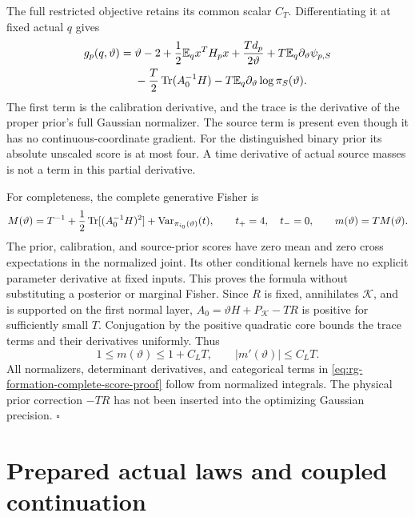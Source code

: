 The full restricted objective retains its common scalar $C_T$.
Differentiating it at fixed actual $q$ gives
\begin{align}
 g_p(q,\vartheta)
 ={}&\vartheta-2+\frac12\mathbb E_qx^TH_px
       +\frac{Td_p}{2\vartheta}
       +T\mathbb E_q\partial_\vartheta\psi_{p,S}
 \notag\\
 &-\frac T2\operatorname{Tr}(A_0^{-1}H)
       -T\mathbb E_q\partial_\vartheta\log\pi_S(\vartheta).
 \label{eq:rg-formation-complete-score-proof}
\end{align}
The first term is the calibration derivative, and the trace is the
derivative of the proper prior's full Gaussian normalizer. The source
term is present even though it has no continuous-coordinate gradient.
For the distinguished binary prior its absolute unscaled score is at
most four. A time derivative of actual source masses is not a term in
this partial derivative.

For completeness, the complete generative Fisher is
\begin{equation}
 M(\vartheta)=T^{-1}
   +\frac12\operatorname{Tr}[(A_0^{-1}H)^2]
   +\operatorname{Var}_{\pi_{i_0}(\vartheta)}(t),
 \qquad t_+=4,\quad t_-=0,
 \qquad m(\vartheta)=TM(\vartheta).
 \label{eq:rg-formation-inherited-metric-proof}
\end{equation}
The prior, calibration, and source-prior scores have zero mean and
zero cross expectations in the normalized joint. Its other conditional
kernels have no explicit parameter derivative at fixed inputs. This
proves the formula without substituting a posterior or marginal
Fisher. Since $R$ is fixed, annihilates $\mathcal K$, and is supported
on the first normal layer, $A_0=\vartheta H+P_{\mathcal K}-TR$ is
positive for sufficiently small $T$. Conjugation by the positive
quadratic core bounds the trace terms and their derivatives uniformly.
Thus
\begin{equation}
 1\le m(\vartheta)\le1+C_LT,\qquad
 |m'(\vartheta)|\le C_LT.
 \label{eq:rg-formation-metric-bounds-proof}
\end{equation}
All normalizers, determinant derivatives, and categorical terms in
\cref{eq:rg-formation-complete-score-proof} follow from normalized
integrals. The physical prior correction $-TR$ has not been inserted
into the optimizing Gaussian precision. \hfill$\square$

\section{Prepared actual laws and coupled continuation}
\label{sec:rg-formation-continuation-proof}

